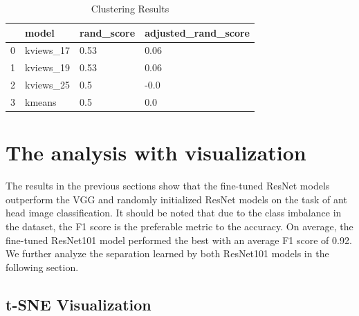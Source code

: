 \documentclass{aci}
\numberwithin{equation}{section}
\begin{document}
\begin{table}[h]
    \centering
    \caption{Clustering Results}
    \begin{tabular}{llll}
        \toprule
        {} & model      & rand\_score & adjusted\_rand\_score \\
        \midrule
        0  & kviews\_17 & 0.53        & 0.06                  \\
        1  & kviews\_19 & 0.53        & 0.06                  \\
        2  & kviews\_25 & 0.5         & -0.0                  \\
        3  & kmeans     & 0.5         & 0.0                   \\
        \bottomrule
    \end{tabular}
\end{table}

\section{The analysis with visualization}

The results in the previous sections show that the fine-tuned ResNet models
outperform the VGG and randomly initialized ResNet models on the task of ant
head image classification. It should be noted that due to the class imbalance in
the dataset, the F1 score is the preferable metric to the accuracy. On average,
the fine-tuned ResNet101 model performed the best with an average F1 score of
0.92. We further analyze the separation learned by both ResNet101 models in the
following section.

\subsection{t-SNE Visualization}
\end{document}
